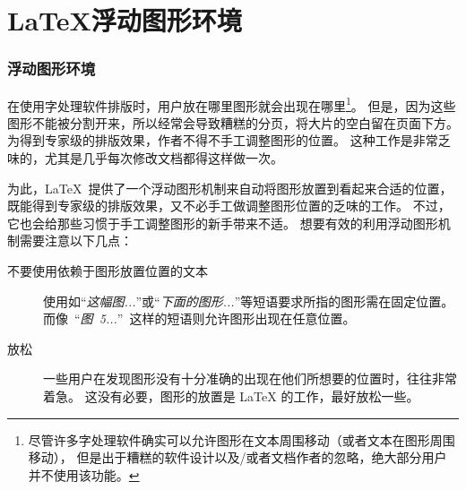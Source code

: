 
\part{\LaTeX{}浮动图形环境}

\section{浮动图形环境}\label{sec:floatfigure}
在使用字处理软件排版时，用户放在哪里图形就会出现在哪里\footnote{
	尽管许多字处理软件确实可以允许图形在文本周围移动（或者文本在图形周围移动），
	但是出于糟糕的软件设计以及/或者文档作者的忽略，绝大部分用户并不使用该功能。}。
但是，因为这些图形不能被分割开来，所以经常会导致糟糕的分页，将大片的空白留在页面下方。
为得到专家级的排版效果，作者不得不手工调整图形的位置。
这种工作是非常乏味的，尤其是几乎每次修改文档都得这样做一次。

为此，\LaTeX{}~提供了一个浮动图形机制来自动将图形放置到看起来合适的位置，
既能得到专家级的排版效果，又不必手工做调整图形位置的乏味的工作。
不过，它也会给那些习惯于手工调整图形的新手带来不适。
想要有效的利用浮动图形机制需要注意以下几点：
\begin{description}
	\item[不要使用依赖于图形放置位置的文本]
	
	使用如“\emph{这幅图...}”或“\emph{下面的图形...}”等短语要求所指的图形需在固定位置。
	而像~``\emph{图~5...}''~这样的短语则允许图形出现在任意位置。
	\item [放松]
	
	一些用户在发现图形没有十分准确的出现在他们所想要的位置时，往往非常着急。
	这没有必要，图形的放置是 \LaTeX{} 的工作，最好放松一些。
\end{description}

